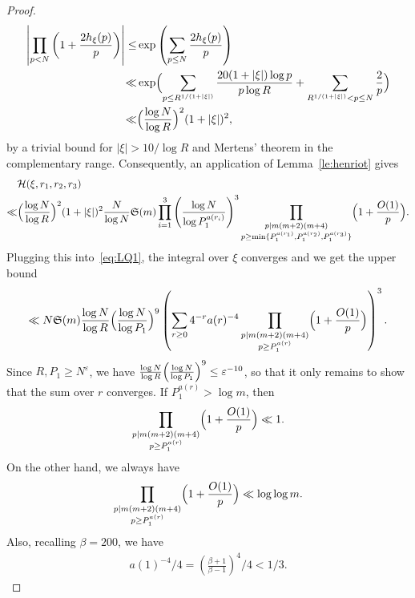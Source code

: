\documentclass[12pt]{amsart}
\theoremstyle{definition}
\theoremstyle{remark}
\numberwithin{equation}{section}
\newcommand{\1}{\mathbf{1}}
\begin{document}
\begin{proof}
\begin{align*}
\begin{split}
	   \left|\prod_{p<N}\left(1+\frac{2 h_{\xi}(p)}{p}\right)\right|\leq& \exp\left(\sum_{p\leq N}\frac{2 h_{\xi}(p)}{p}\right)\\
	   \ll & \exp\Bigl(\sum_{p\leq R^{1/(1+|\xi|)}}\frac{20(1+|\xi|)\log p}{p\log R}+\sum_{R^{1/(1+|\xi|)}<p\leq N}\frac{2}{p}\Bigr)\\
	   \ll& \Bigl(\frac{\log N}{\log R}\Bigr)^2(1+|\xi|)^2,
	   \end{split}
	\end{align*}
    by a trivial bound for $|\xi|>10/\log R$ and Mertens' theorem in the complementary range. Consequently, an application of Lemma~\ref{le:henriot} gives
    \begin{align*}
        &\mathcal{H}(\xi,r_1,r_2,r_3)\\
        \ll&  \Bigl(\frac{\log N}{\log R}\Bigr)^2(1+|\xi|)^2\frac{N}{\log N}\mathfrak{S}(m) \prod_{i=1}^3 \left(\frac{\log N}{\log P_1^{a(r_i)}}\right)^{3} \prod_{\substack{p\mid m (m+2)(m+4)\\ p\geq \min\{P_1^{a(r_1)},P_1^{a(r_2)},P_1^{a(r_3)}\}}}\Bigl(1+\frac{O(1)}{p}\Bigr).
    \end{align*}
    Plugging this into~\eqref{eq:LQ1}, the integral over $\xi$ converges and we get the upper bound
    \begin{align*}
        \ll N \mathfrak{S}(m)\frac{\log N}{\log R} \Bigl(\frac{\log N}{\log P_1}\Bigr)^9 \left(\sum_{r\geq 0}4^{-r}a(r)^{-4}\prod_{\substack{p\mid m (m+2)(m+4)\\ p\geq P_1^{a(r)}}}\Bigl(1+\frac{O(1)}{p}\Bigr) \right)^3.
    \end{align*}
    Since $R,P_1\geq N^{\varepsilon}$, we have $\frac{\log N}{\log R} \Bigl(\frac{\log N}{\log P_1}\Bigr)^9\leq \varepsilon^{-10}$,  so that it only remains to show that the sum over $r$ converges. 
    If $P_1^{a(r)}>\log m$, then
    \begin{align*}
        \prod_{\substack{p\mid m (m+2)(m+4)\\ p\geq P_1^{a(r)}}}\Bigl(1+\frac{O(1)}{p}\Bigr)\ll 1.
    \end{align*}
    On the other hand, we always have 
    \begin{align*}
        \prod_{\substack{p\mid m (m+2)(m+4)\\ p\geq P_1^{a(r)}}}\Bigl(1+\frac{O(1)}{p}\Bigr)\ll \log \log m. 
    \end{align*}
    Also, recalling $\beta=200$, we have
    \begin{align*}
         a(1)^{-4}/4= \left(\frac{\beta+1}{\beta-1}\right)^4/4<1/3.

\end{align*}
\end{proof}
\end{document}
